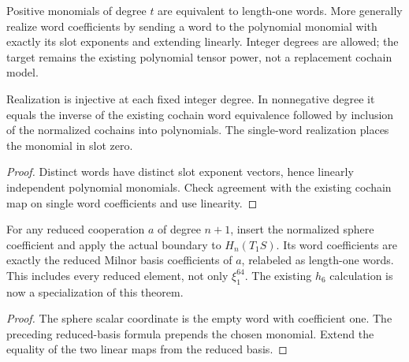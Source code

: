 \begin{definition}
  \label{def:h6-word-polynomial-realization}
  \leanok
  Positive monomials of degree $t$ are equivalent to length-one words.
  More generally realize word coefficients by sending a word to the
  polynomial monomial with exactly its slot exponents and extending linearly.
  Integer degrees are allowed; the target remains the existing polynomial
  tensor power, not a replacement cochain model.
\end{definition}

\begin{proposition}
  \label{prop:h6-word-polynomial-realization}
  \leanok
  Realization is injective at each fixed integer degree. In nonnegative
  degree it equals the inverse of the existing cochain word equivalence
  followed by inclusion of the normalized cochains into polynomials.
  The single-word realization places the monomial in slot zero.
\end{proposition}
\begin{proof}
  Distinct words have distinct slot exponent vectors, hence linearly
  independent polynomial monomials. Check agreement with the existing
  cochain map on single word coefficients and use linearity.
  \leanok
\end{proof}

\begin{proposition}
  \label{prop:h6-first-boundary-word-coordinate}
  \leanok
  For any reduced cooperation $a$ of degree $n+1$, insert the normalized
  sphere coefficient and apply the actual boundary to $H_n(T_1 S)$.
  Its word coefficients are exactly the reduced Milnor basis coefficients
  of $a$, relabeled as length-one words. This includes every reduced
  element, not only $\xi_1^{64}$. The existing $h_6$ calculation is now
  a specialization of this theorem.
\end{proposition}
\begin{proof}
  The sphere scalar coordinate is the empty word with coefficient one.
  The preceding reduced-basis formula prepends the chosen monomial.
  Extend the equality of the two linear maps from the reduced basis.
  \leanok
\end{proof}

